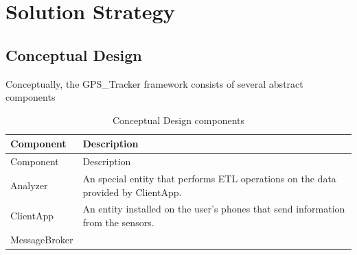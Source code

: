 \hypertarget{solution-strategy}{%
\section{Solution Strategy}\label{solution-strategy}}

\hypertarget{conceptual-design}{%
\subsection{Conceptual Design}\label{conceptual-design}}

Conceptually, the GPS\_Tracker framework consists of several abstract
components

\begin{longtable}[]{@{}ll@{}}
\caption{Conceptual Design components}\tabularnewline
\toprule
\begin{minipage}[b]{0.47\columnwidth}\raggedright
Component\strut
\end{minipage} & \begin{minipage}[b]{0.47\columnwidth}\raggedright
Description\strut
\end{minipage}\tabularnewline
\midrule
\endfirsthead
\toprule
\begin{minipage}[b]{0.47\columnwidth}\raggedright
Component\strut
\end{minipage} & \begin{minipage}[b]{0.47\columnwidth}\raggedright
Description\strut
\end{minipage}\tabularnewline
\midrule
\endhead
\begin{minipage}[t]{0.47\columnwidth}\raggedright
Analyzer\strut
\end{minipage} & \begin{minipage}[t]{0.47\columnwidth}\raggedright
An special entity that performs ETL operations on the data provided by
ClientApp.\strut
\end{minipage}\tabularnewline
\begin{minipage}[t]{0.47\columnwidth}\raggedright
ClientApp\strut
\end{minipage} & \begin{minipage}[t]{0.47\columnwidth}\raggedright
An entity installed on the user's phones that send information from the
sensors.\strut
\end{minipage}\tabularnewline
\begin{minipage}[t]{0.47\columnwidth}\raggedright
MessageBroker\strut
\end{minipage} & \begin{minipage}[t]{0.47\columnwidth}\raggedright

\end{minipage}
\end{longtable}
